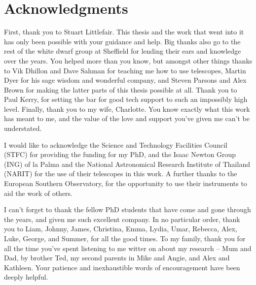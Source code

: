 \chapter*{Acknowledgments}


First, thank you to Stuart Littlefair. This thesis and the work that went into it has only been possible with your guidance and help.
Big thanks also go to the rest of the white dwarf group at Sheffield for lending their ears and knowledge over the years. You helped more than you know, but amongst other things thanks to Vik Dhillon and Dave Sahman for teaching me how to use telescopes, Martin Dyer for his sage wisdom and wonderful company, and Steven Parsons and Alex Brown for making the latter parts of this thesis possible at all.
Thank you to Paul Kerry, for setting the bar for good tech support to such an impossibly high level.
Finally, thank you to my wife, Charlotte. You know exactly what this work has meant to me, and the value of the love and support you've given me can't be understated.

I would like to acknowledge the Science and Technology Facilities Council (STFC) for providing the funding for my PhD, and the Isaac Newton Group (ING) of la Palma and the National Astronomical Research Institute of Thailand (NARIT) for the use of their telescopes in this work. A further thanks to the European Southern Observatory, for the opportunity to use their instruments to aid the work of others.

I can't forget to thank the fellow PhD students that have come and gone through the years, and given me such excellent company. In no particular order, thank you to Liam, Johnny, James, Christina, Emma, Lydia, Umar, Rebecca, Alex, Luke, George, and Summer, for all the good times.
To my family, thank you for all the time you've spent listening to me witter on about my research -- Mum and Dad, by brother Ted, my second parents in Mike and Angie, and Alex and Kathleen. Your patience and inexhaustible words of encouragement have been deeply helpful.